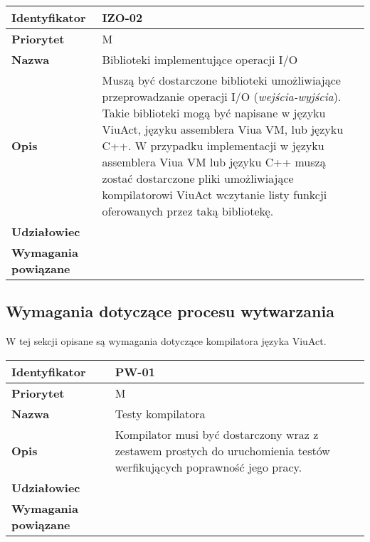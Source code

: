 \begin{tabular}{ | l | l | }
    \hline
    \textbf{Identyfikator} & \parbox[t]{11cm}{IZO-02} \\
    \hline
    \textbf{Priorytet} & M \\
    \hline
    \textbf{Nazwa} & Biblioteki implementujące operacji I/O \\
    \hline
    \textbf{Opis} & \parbox[t]{11cm}{
        Muszą być dostarczone biblioteki umożliwiające przeprowadzanie operacji I/O (\emph{wejścia-wyjścia}).
        Takie biblioteki mogą być napisane w języku ViuAct, języku assemblera Viua VM, lub języku C++.
        W przypadku implementacji w języku assemblera Viua VM lub języku C++ muszą zostać dostarczone pliki
        umożliwiające kompilatorowi ViuAct wczytanie listy funkcji oferowanych przez taką bibliotekę.
    } \\
    \hline
    \textbf{Udziałowiec} & \phantom{} \\
    \hline
    \textbf{Wymagania powiązane} & \phantom{} \\
    \hline
\end{tabular}

\subsection{Wymagania dotyczące procesu wytwarzania}

W tej sekcji opisane są wymagania dotyczące kompilatora języka ViuAct.

\vspace{1em}

\begin{tabular}{ | l | l | }
    \hline
    \textbf{Identyfikator} & \parbox[t]{11cm}{PW-01} \\
    \hline
    \textbf{Priorytet} & M \\
    \hline
    \textbf{Nazwa} & Testy kompilatora \\
    \hline
    \textbf{Opis} & \parbox[t]{11cm}{
        Kompilator musi być dostarczony wraz z zestawem prostych do uruchomienia testów werfikujących
        poprawność jego pracy.
    } \\
    \hline
    \textbf{Udziałowiec} & \phantom{} \\
    \hline
    \textbf{Wymagania powiązane} & \phantom{} \\
    \hline
\end{tabular}

\vspace{1em}

